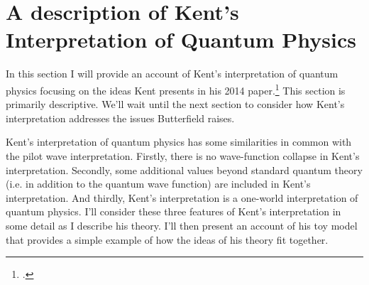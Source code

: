 
\section{A description of Kent's Interpretation of Quantum Physics}
In this section I will provide an account of Kent's interpretation of quantum physics focusing on the ideas Kent presents in his 2014 paper.\footnote{\cite{Kent2014}.} This section is primarily descriptive. We'll wait until the next section to consider how Kent's interpretation addresses the issues Butterfield raises.

Kent's interpretation of quantum physics has some similarities in common with the pilot wave interpretation. Firstly,  there is no wave-function collapse in Kent's interpretation. Secondly, some additional values beyond standard quantum theory (i.e. in addition to the quantum wave function) are included in Kent's interpretation. And thirdly, Kent's interpretation is a one-world interpretation of quantum physics. I'll consider these three features of Kent's interpretation in some detail as I describe his theory. I'll then present an account of his toy model that provides a simple example of how the ideas of his theory fit together. 

